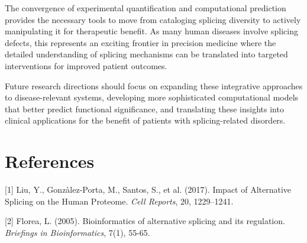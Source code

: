\documentclass[12pt,a4paper]{article}
\begin{document}
The convergence of experimental quantification and computational prediction provides the necessary tools to move from cataloging splicing diversity to actively manipulating it for therapeutic benefit. As many human diseases involve splicing defects, this represents an exciting frontier in precision medicine where the detailed understanding of splicing mechanisms can be translated into targeted interventions for improved patient outcomes.

Future research directions should focus on expanding these integrative approaches to disease-relevant systems, developing more sophisticated computational models that better predict functional significance, and translating these insights into clinical applications for the benefit of patients with splicing-related disorders.

\section{References}

[1] Liu, Y., Gonzàlez-Porta, M., Santos, S., et al. (2017). Impact of Alternative Splicing on the Human Proteome. \textit{Cell Reports}, 20, 1229–1241.

[2] Florea, L. (2005). Bioinformatics of alternative splicing and its regulation. \textit{Briefings in Bioinformatics}, 7(1), 55-65.
\end{document}

